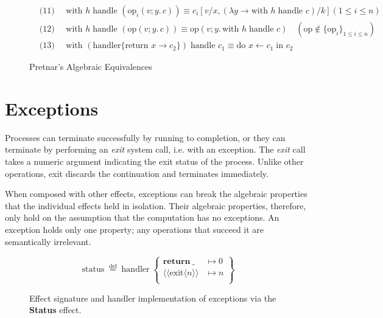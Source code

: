 \documentclass[logo,bsc,singlespacing,parskip]{infthesis}
\begin{document}
\begin{figure}[H]
\begin{tcolorbox}[colframe=black, colback=white, sharp corners]
\begin{align*}
        &\text{(11) } \quad \text{with } h \; \text{handle } (\text{op}_i(v; y.\, c)) \equiv c_i[v/x, (\lambda y \rightarrow \text{with } h \; \text{handle } c)/k]  (1 \leq i \leq n) \\
        &\text{(12) } \quad \text{with } h \; \text{handle } (\text{op}(v; y.\, c)) \equiv \text{op}(v; y.\, \text{with } h \; \text{handle } c) \quad (\text{op} \notin \{\text{op}_i\}_{1 \leq i \leq n}) \\
        &\text{(13) } \quad \text{with } (\text{handler} \{\text{return } x \rightarrow c_2\}) \; \text{handle } c_1 \equiv \text{do } x \leftarrow c_1 \; \text{in } c_2
    \end{align*}
    \end{tcolorbox}

    \caption{Pretnar's Algebraic Equivalences}
    \label{fig:equational-laws}
\end{figure}

\vspace{-1em}
\section{Exceptions}
Processes can terminate successfully by running to completion, or they can terminate by performing an \textit{exit} system call, i.e. with an exception. The \textit{exit} call takes a numeric argument indicating the exit status of the process. Unlike other operations, exit discards the continuation and terminates immediately.

When composed with other effects, exceptions can break the algebraic properties that the individual effects held in isolation. Their algebraic properties, therefore, only hold on the assumption that the computation has no exceptions. An exception holds only one property; any operations that succeed it are semantically irrelevant.

\begin{figure}[H]
\centering


\vspace{-1em}

\[
\mathrm{status} \;\overset{\mathrm{def}}{=}\;
\mathrm{handler} \;\left\{
\begin{array}{ll}
  \mathrm{\textbf{return}\:\_} & \mapsto 0 \\[0.5ex]
  \langle\!\langle \mathrm{exit} \langle n\rangle\rangle & \mapsto n \\[0.5ex]
\end{array}
\right\}
\]

\caption{Effect signature and handler implementation of exceptions via the \textbf{Status} effect.}
\label{fig:status-handler}
\end{figure}
\end{document}
